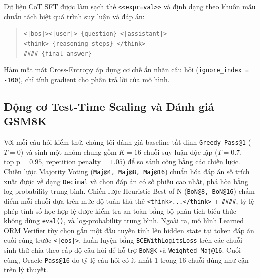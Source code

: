 Dữ liệu CoT SFT được làm sạch thẻ \texttt{<<expr=val>>} và định dạng theo khuôn mẫu chuẩn tách biệt quá trình suy luận và đáp án:
\begin{quote}
\small\texttt{<|bos|><|user|> \{question\} <|assistant|>} \\
\texttt{<think> \{reasoning\_steps\} </think>} \\
\texttt{\#\#\#\# \{final\_answer\}<|eos|>}
\end{quote}
Hàm mất mát Cross-Entropy áp dụng cơ chế ẩn nhãn câu hỏi (\texttt{ignore\_index = -100}), chỉ tính gradient cho phần trả lời của mô hình.

\subsection{Động cơ Test-Time Scaling và Đánh giá GSM8K}
Với mỗi câu hỏi kiểm thử, chúng tôi đánh giá baseline tất định \texttt{Greedy Pass@1} ($T=0$) và sinh một nhóm chung gồm $K=16$ chuỗi suy luận độc lập ($T=0.7$, $\text{top\_p}=0.95$, $\text{repetition\_penalty}=1.05$) để so sánh công bằng các chiến lược. Chiến lược Majority Voting (\texttt{Maj@4, Maj@8, Maj@16}) chuẩn hóa đáp án số trích xuất được về dạng \texttt{Decimal} và chọn đáp án có số phiếu cao nhất, phá hòa bằng log-probability trung bình. Chiến lược Heuristic Best-of-N (\texttt{BoN@8, BoN@16}) chấm điểm mỗi chuỗi dựa trên mức độ tuân thủ thẻ \texttt{<think>...</think>} + \texttt{\#\#\#\#}, tỷ lệ phép tính số học hợp lệ được kiểm tra an toàn bằng bộ phân tích biểu thức không dùng \texttt{eval()}, và log-probability trung bình. Ngoài ra, mô hình Learned ORM Verifier tùy chọn gắn một đầu tuyến tính lên hidden state tại token đáp án cuối cùng trước \texttt{<|eos|>}, huấn luyện bằng \texttt{BCEWithLogitsLoss} trên các chuỗi sinh thử chia theo cấp độ câu hỏi để hỗ trợ \texttt{BoN@K} và \texttt{Weighted Maj@16}. Cuối cùng, Oracle \texttt{Pass@16} đo tỷ lệ câu hỏi có ít nhất 1 trong 16 chuỗi đúng như cận trên lý thuyết.
